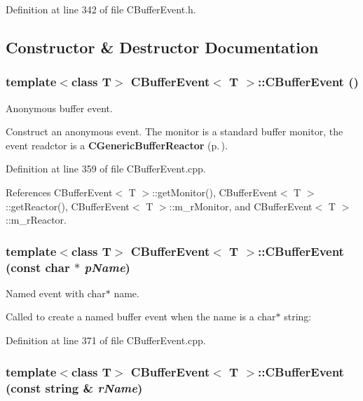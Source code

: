 Definition at line 342 of file CBuffer\-Event.h.

\subsection{Constructor \& Destructor Documentation}
\subsubsection{\setlength{\rightskip}{0pt plus 5cm}template$<$class T$>$ CBuffer\-Event$<$ T $>$::CBuffer\-Event ()}\label{classCBufferEvent_a0}


Anonymous buffer event.

Construct an anonymous event. The monitor is a standard buffer monitor, the event readctor is a {\bf CGeneric\-Buffer\-Reactor} {\rm (p.\,\pageref{classCBufferEvent_1_1CGenericBufferReactor})}. 

Definition at line 359 of file CBuffer\-Event.cpp.

References CBuffer\-Event$<$ T $>$::get\-Monitor(), CBuffer\-Event$<$ T $>$::get\-Reactor(), CBuffer\-Event$<$ T $>$::m\_\-r\-Monitor, and CBuffer\-Event$<$ T $>$::m\_\-r\-Reactor.
\subsubsection{\setlength{\rightskip}{0pt plus 5cm}template$<$class T$>$ CBuffer\-Event$<$ T $>$::CBuffer\-Event (const char $\ast$ {\em p\-Name})}\label{classCBufferEvent_a1}


Named event with char$\ast$ name.

Called to create a named buffer event when the name is a char$\ast$ string: 

Definition at line 371 of file CBuffer\-Event.cpp.
\subsubsection{\setlength{\rightskip}{0pt plus 5cm}template$<$class T$>$ CBuffer\-Event$<$ T $>$::CBuffer\-Event (const string \& {\em r\-Name})}\label{classCBufferEvent_a2}


